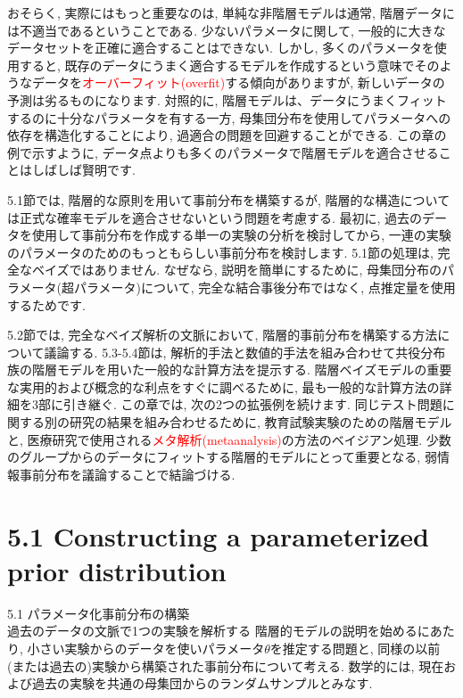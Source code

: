 \documentclass[10pt,dvipdfmx,a4]{beamer}
\newcommand{\tcr}[1]{\textcolor{red}{#1}}
\begin{document}
\begin{frame}
おそらく, 実際にはもっと重要なのは, 単純な非階層モデルは通常, 階層データには不適当であるということである.
少ないパラメータに関して, 一般的に大きなデータセットを正確に適合することはできない.
しかし, 多くのパラメータを使用すると, 既存のデータにうまく適合するモデルを作成するという意味でそのようなデータを\tcr{オーバーフィット(overfit)}する傾向がありますが, 新しいデータの予測は劣るものになります.
対照的に, 階層モデルは、データにうまくフィットするのに十分なパラメータを有する一方, 母集団分布を使用してパラメータへの依存を構造化することにより, 過適合の問題を回避することができる.
この章の例で示すように, データ点よりも多くのパラメータで階層モデルを適合させることはしばしば賢明です.

5.1節では, 階層的な原則を用いて事前分布を構築するが, 階層的な構造については正式な確率モデルを適合させないという問題を考慮する.
最初に, 過去のデータを使用して事前分布を作成する単一の実験の分析を検討してから, 一連の実験のパラメータのためのもっともらしい事前分布を検討します.
5.1節の処理は, 完全なベイズではありません.
なぜなら, 説明を簡単にするために, 母集団分布のパラメータ(超パラメータ)について, 完全な結合事後分布ではなく, 点推定量を使用するためです.
\end{frame}


\begin{frame}
5.2節では, 完全なベイズ解析の文脈において, 階層的事前分布を構築する方法について議論する.
5.3-5.4節は, 解析的手法と数値的手法を組み合わせて共役分布族の階層モデルを用いた一般的な計算方法を提示する.
階層ベイズモデルの重要な実用的および概念的な利点をすぐに調べるために, 最も一般的な計算方法の詳細を3部に引き継ぐ.
この章では, 次の2つの拡張例を続けます.
同じテスト問題に関する別の研究の結果を組み合わせるために, 教育試験実験のための階層モデルと, 医療研究で使用される\tcr{メタ解析(metaanalysis)}の方法のベイジアン処理.
少数のグループからのデータにフィットする階層的モデルにとって重要となる, 弱情報事前分布を議論することで結論づける.
\end{frame}

\section{5.1 Constructing a parameterized prior distribution}
\begin{frame}{5.1 パラメータ化事前分布の構築\\過去のデータの文脈で1つの実験を解析する}
階層的モデルの説明を始めるにあたり, 小さい実験からのデータを使いパラメータ$\theta$を推定する問題と, 同様の以前(または過去の)実験から構築された事前分布について考える.
数学的には, 現在および過去の実験を共通の母集団からのランダムサンプルとみなす.
\end{frame}
\end{document}
